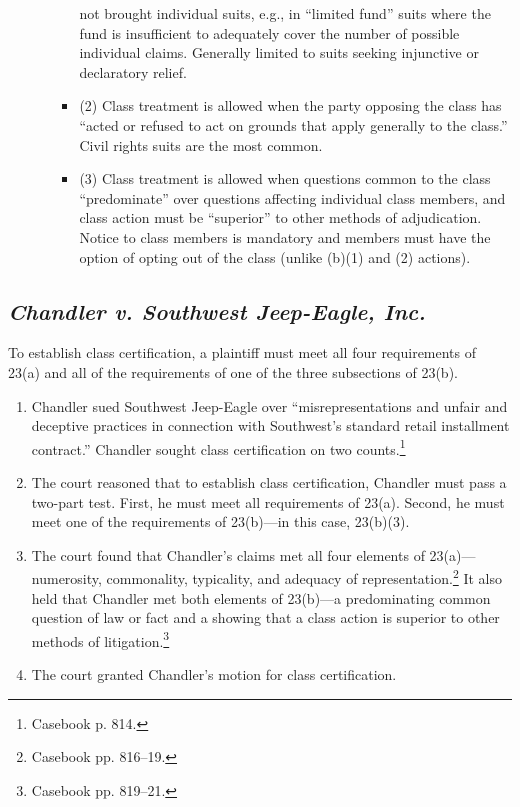 \begin{enumerate}
\begin{itemize}
\begin{itemize}
            not brought individual suits, e.g., in ``limited fund'' suits
            where the fund is insufficient to adequately cover the number of
            possible individual claims. Generally limited to suits seeking
            injunctive or declaratory relief.
            \item (2) Class treatment is allowed when the party opposing the
            class has ``acted or refused to act on grounds that apply
            generally to the class.'' Civil rights suits are the most common.
            \item (3) Class treatment is allowed when questions common to the
            class ``predominate'' over questions affecting individual class
            members, and class action must be ``superior'' to other methods of
            adjudication. Notice to class members is mandatory and members
            must have the option of opting out of the class (unlike (b)(1) and
            (2) actions).
        \end{itemize}
    \end{itemize}
\end{enumerate}

\subsection{\emph{Chandler v. Southwest Jeep-Eagle, Inc.}}

To establish class certification, a plaintiff must meet all four requirements 
of 23(a) and all of the requirements of one of the three subsections of 23(b).

\begin{enumerate}
    \item Chandler sued Southwest Jeep-Eagle over ``misrepresentations and 
    unfair and deceptive practices in connection with Southwest's standard 
    retail installment contract.'' Chandler sought class certification on two 
    counts.\footnote{Casebook p. 814.}
    \item The court reasoned that to establish class certification, Chandler 
    must pass a two-part test. First, he must meet all requirements of 23(a). 
    Second, he must meet one of the requirements of 23(b)---in this case, 
    23(b)(3).
    \item The court found that Chandler's claims met all four elements of 
    23(a)---numerosity, commonality, typicality, and adequacy of 
    representation.\footnote{Casebook pp. 816--19.} It also held that Chandler 
    met both elements of 23(b)---a predominating common question of law or 
    fact and a showing that a class action is superior to other methods of 
    litigation.\footnote{Casebook pp. 819--21.}
    \item The court granted Chandler's motion for class certification.
\end{enumerate}

